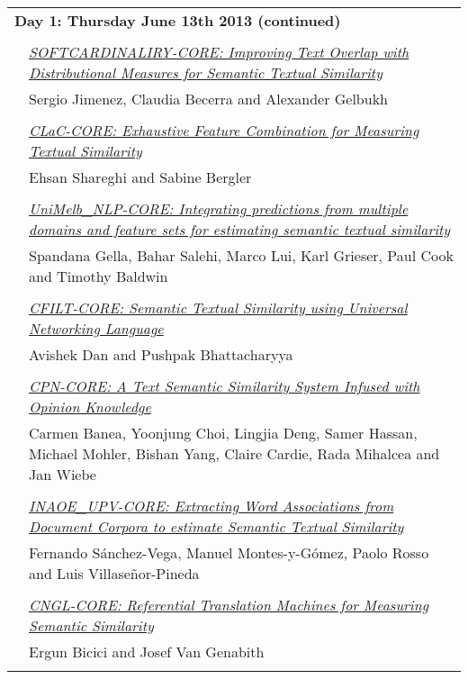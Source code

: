 \begin{tabular}{p{20mm}p{138mm}}
\\
\multicolumn{2}{l}{\bf Day 1: Thursday June 13th 2013 (continued)} \\\\
 & \hyperlink{page.195}{\em SOFTCARDINALIRY-CORE: Improving Text Overlap with Distributional Measures for Semantic Textual Similarity}\\
         & Sergio Jimenez, Claudia Becerra and Alexander Gelbukh \\
\\

 & \hyperlink{page.203}{\em CLaC-CORE: Exhaustive Feature Combination for Measuring Textual Similarity}\\
         & Ehsan Shareghi and Sabine Bergler \\
\\

 & \hyperlink{page.208}{\em UniMelb\_NLP-CORE: Integrating predictions from multiple domains and feature sets for estimating semantic textual similarity}\\
         & Spandana Gella, Bahar Salehi, Marco Lui, Karl Grieser, Paul Cook and Timothy Baldwin \\
\\

 & \hyperlink{page.217}{\em CFILT-CORE: Semantic Textual Similarity using Universal Networking Language}\\
         & Avishek Dan and Pushpak Bhattacharyya \\
\\

 & \hyperlink{page.222}{\em CPN-CORE: A Text Semantic Similarity System Infused with Opinion Knowledge}\\
         & Carmen Banea, Yoonjung Choi, Lingjia Deng, Samer Hassan, Michael Mohler, Bishan Yang, Claire Cardie, Rada Mihalcea and Jan Wiebe \\
\\

 & \hyperlink{page.230}{\em INAOE\_UPV-CORE: Extracting Word Associations from Document Corpora to estimate Semantic Textual Similarity}\\
         & Fernando S\'{a}nchez-Vega, Manuel Montes-y-G\'{o}mez, Paolo Rosso and Luis Villase\~{n}or-Pineda \\
\\

 & \hyperlink{page.235}{\em CNGL-CORE: Referential Translation Machines for Measuring Semantic Similarity}\\
         & Ergun Bicici and Josef Van Genabith \\
\\


\end{tabular}
